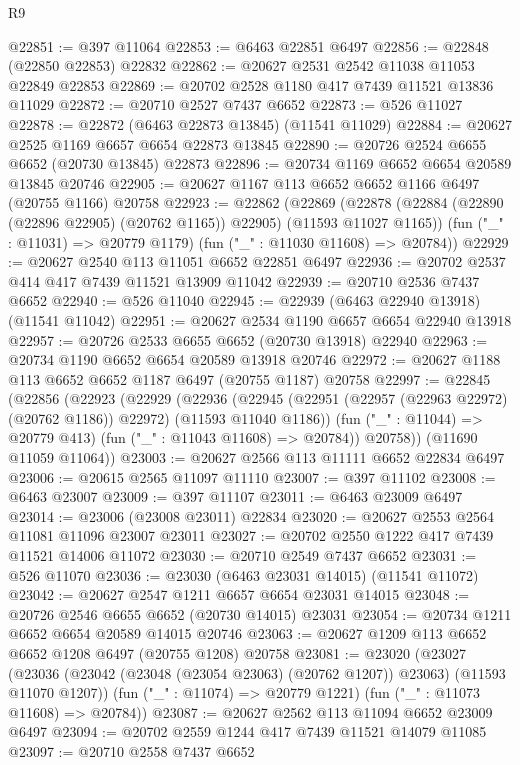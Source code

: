 \begin{lexlean}{R9}
\begin{coremodule}
{{{{{{{{{{{{{{{{{{{{{{{{{{{{{{{{{{{{{{{{{{{{{{{{{{{{{{{{{{{{{{{{{{{{{{{{{{{{{{{{{{{{@22851 := @397 @11064
@22853 := @6463 @22851 @6497
@22856 := @22848 (@22850 @22853) @22832
@22862 := @20627 @2531 @2542 @11038 @11053 @22849 @22853
@22869 := @20702 @2528 @1180 @417 @7439 @11521 @13836 @11029
@22872 := @20710 @2527 @7437 @6652
@22873 := @526 @11027
@22878 := @22872 (@6463 @22873 @13845) (@11541 @11029)
@22884 := @20627 @2525 @1169 @6657 @6654 @22873 @13845
@22890 := @20726 @2524 @6655 @6652 (@20730 @13845) @22873
@22896 := @20734 @1169 @6652 @6654 @20589 @13845 @20746
@22905 := @20627 @1167 @113 @6652 @6652 @1166 @6497 (@20755 @1166) @20758
@22923 := @22862
    (@22869
      (@22878 (@22884 (@22890 (@22896 @22905) (@20762 @1165)) @22905) (@11593 @11027 @1165))
      (fun ("_" : @11031) => @20779 @1179)
      (fun ("_" : @11030 @11608) => @20784))
@22929 := @20627 @2540 @113 @11051 @6652 @22851 @6497
@22936 := @20702 @2537 @414 @417 @7439 @11521 @13909 @11042
@22939 := @20710 @2536 @7437 @6652
@22940 := @526 @11040
@22945 := @22939 (@6463 @22940 @13918) (@11541 @11042)
@22951 := @20627 @2534 @1190 @6657 @6654 @22940 @13918
@22957 := @20726 @2533 @6655 @6652 (@20730 @13918) @22940
@22963 := @20734 @1190 @6652 @6654 @20589 @13918 @20746
@22972 := @20627 @1188 @113 @6652 @6652 @1187 @6497 (@20755 @1187) @20758
@22997 := @22845
    (@22856
      (@22923
        (@22929
          (@22936
            (@22945 (@22951 (@22957 (@22963 @22972) (@20762 @1186)) @22972) (@11593 @11040 @1186))
            (fun ("_" : @11044) => @20779 @413)
            (fun ("_" : @11043 @11608) => @20784))
          @20758))
      (@11690 @11059 @11064))
@23003 := @20627 @2566 @113 @11111 @6652 @22834 @6497
@23006 := @20615 @2565 @11097 @11110
@23007 := @397 @11102
@23008 := @6463 @23007
@23009 := @397 @11107
@23011 := @6463 @23009 @6497
@23014 := @23006 (@23008 @23011) @22834
@23020 := @20627 @2553 @2564 @11081 @11096 @23007 @23011
@23027 := @20702 @2550 @1222 @417 @7439 @11521 @14006 @11072
@23030 := @20710 @2549 @7437 @6652
@23031 := @526 @11070
@23036 := @23030 (@6463 @23031 @14015) (@11541 @11072)
@23042 := @20627 @2547 @1211 @6657 @6654 @23031 @14015
@23048 := @20726 @2546 @6655 @6652 (@20730 @14015) @23031
@23054 := @20734 @1211 @6652 @6654 @20589 @14015 @20746
@23063 := @20627 @1209 @113 @6652 @6652 @1208 @6497 (@20755 @1208) @20758
@23081 := @23020
    (@23027
      (@23036 (@23042 (@23048 (@23054 @23063) (@20762 @1207)) @23063) (@11593 @11070 @1207))
      (fun ("_" : @11074) => @20779 @1221)
      (fun ("_" : @11073 @11608) => @20784))
@23087 := @20627 @2562 @113 @11094 @6652 @23009 @6497
@23094 := @20702 @2559 @1244 @417 @7439 @11521 @14079 @11085
@23097 := @20710 @2558 @7437 @6652
}}}}}}}}}}}}}}}}}}}}}}}}}}}}}}}}}}}}}}}}}}}}}}}}}}}}}}}}}}}}}}}}}}}}}}}}}}}}}}}}}}}}
\end{coremodule}
\end{lexlean}
